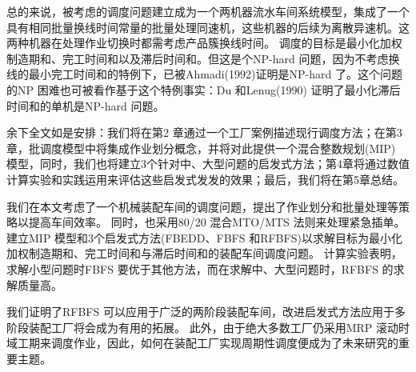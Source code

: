 总的来说，被考虑的调度问题建立成为一个两机器流水车间系统模型，集成了一个具有相同批量换线时间常量的批量处理同速机，这些机器的后续为离散异速机。这两种机器在处理作业切换时都需考虑产品簇换线时间。
调度的目标是最小化加权制造期和、完工时间和以及滞后时间和。但这是个NP-hard 问题，因为不考虑换线的最小完工时间和的特例下，已被Ahmadi(1992)证明是NP-hard 了。这个问题的NP 困难也可被看作基于这个特例事实：Du 和Lenug(1990) 证明了最小化滞后时间和的单机是NP-hard 问题。

余下全文如是安排：我们将在第2 章通过一个工厂案例描述现行调度方法；在第3章，批调度模型中将集成作业划分概念，并将对此提供一个混合整数规划(MIP) 模型，同时，我们也将建立3个针对中、大型问题的启发式方法；第4章将通过数值计算实验和实践运用来评估这些启发式发发的效果；最后，我们将在第5章总结。



我们在本文考虑了一个机械装配车间的调度问题，提出了作业划分和批量处理等策略以提高车间效率。
同时，也采用80/20 混合MTO/MTS 法则来处理紧急插单。建立MIP 模型和3个启发式方法(FBEDD、FBFS 和RFBFS)以求解目标为最小化加权制造期和、完工时间和与滞后时间和的装配车间调度问题。
计算实验表明，求解小型问题时FBFS 要优于其他方法，而在求解中、大型问题时，RFBFS 的求解质量高。

我们证明了RFBFS 可以应用于广泛的两阶段装配车间，改进启发式方法应用于多阶段装配工厂将会成为有用的拓展。
此外，由于绝大多数工厂仍采用MRP 滚动时域工期来调度作业，因此，如何在装配工厂实现周期性调度便成为了未来研究的重要主题。
